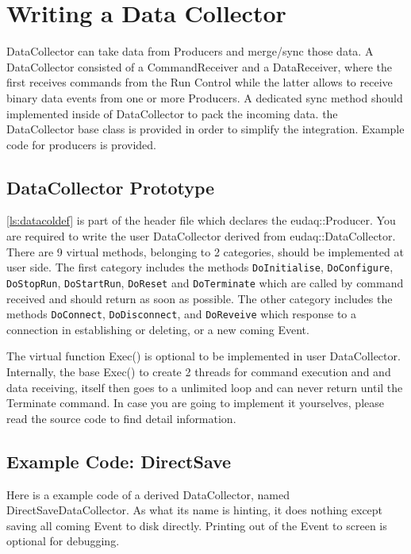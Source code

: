 \section{Writing a Data Collector}\label{sec:DataCollectorWriting}
DataCollector can take data from Producers and merge/sync those data.
A DataCollector consisted of a CommandReceiver and a DataReceiver, where the first receives commands from the Run Control while the latter allows to receive binary data events from one or more Producers. A dedicated sync method should implemented inside of DataCollector to pack the incoming data.
the DataCollector base class is provided in order to simplify the integration. Example code for producers is provided.

\subsection{DataCollector Prototype}\label{sec:datacollector_hh}

\autoref{ls:datacoldef} is part of the header file which declares the eudaq::Producer. You are required to write the user DataCollector derived from eudaq::DataCollector.
There are 9 virtual methods, belonging to 2 categories, should be implemented at user side. The first category includes the methods \lstinline[style=cpp]{DoInitialise},
\lstinline[style=cpp]{DoConfigure}, \lstinline[style=cpp]{DoStopRun}, \lstinline[style=cpp]{DoStartRun}, \lstinline[style=cpp]{DoReset} and \lstinline[style=cpp]{DoTerminate} which are called by command received and should return as soon as possible. The other category includes the methods \lstinline[style=cpp]{DoConnect}, \lstinline[style=cpp]{DoDisconnect}, and \lstinline[style=cpp]{DoReveive} which response to a connection in establishing or deleting, or a new coming Event.



The virtual function Exec() is optional to be implemented in user DataCollector. Internally, the base Exec() to create 2 threads for command execution and and data receiving,  itself then goes to a unlimited loop and can never return until the Terminate command. In case you are going to implement it yourselves, please read the source code to find detail information.

\subsection{Example Code: DirectSave}\label{sec:directsavedatacollector_cc}
Here is a example code of a derived DataCollector, named DirectSaveDataCollector. As what its name is hinting,  it does nothing except saving all coming Event to disk directly. Printing out of the Event to screen is optional for debugging.


